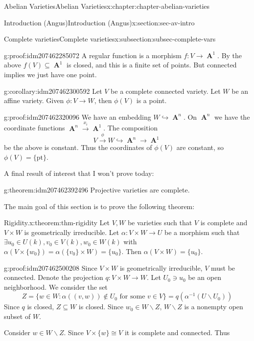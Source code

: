 \documentclass[oneside,10pt,]{book}
\numberwithin{equation}{section}
\DeclareMathOperator{\aff}{\mathbf{A}}
\begin{document}
\begin{chapterptx}{Abelian Varieties}{}{Abelian Varieties}{}{}{x:chapter:chapter-abelian-varieties}
\begin{sectionptx}{Introduction (Angus)}{}{Introduction (Angus)}{}{}{x:section:sec-av-intro}
\begin{subsectionptx}{Complete varieties}{}{Complete varieties}{}{}{x:subsection:subsec-complete-vars}
\begin{proofptx}{}{g:proof:idm207462285072}
A regular function is a morphism \(f\colon V \to \aff^1\). By the above \(f(V) \subseteq \aff^1\) is closed, and this is a finite set of points. But connected implies we just have one point.%
\end{proofptx}
\begin{corollary}{}{}{g:corollary:idm207462300592}%
Let \(V \) be a complete connected variety. Let \(W\) be an affine variety. Given \(\phi\colon V\to W\), then \(\phi (V)\) is a point.%
\end{corollary}
\begin{proofptx}{}{g:proof:idm207462320096}
We have an embedding \(W \hookrightarrow \aff^n\). On \(\aff^n\) we have the coordinate functions \(\aff^n \xrightarrow{x_i} \aff^1\). The composition%
\begin{equation*}
V \xrightarrow\phi W \hookrightarrow\aff^n \to \aff^1
\end{equation*}
be the above is constant. Thus the coordinates of \(\phi(V)\) are constant, so \(\phi(V) = \{\text{pt}\}\).%
\end{proofptx}
A final result of interest that I won't prove today:%
\begin{theorem}{}{}{g:theorem:idm207462392496}%
Projective varieties are complete.%
\end{theorem}
The main goal of this section is to prove the following theorem:%
\begin{theorem}{Rigidity.}{}{x:theorem:thm-rigidity}%
Let \(V,W\) be varieties such that \(V\) is complete and  \(V\times W\) is geometrically irreducible. Let \(\alpha\colon V\times W \to U\) be a morphism such that \(\exists u_0\in U(k), v_0\in V(k), w_0\in W(k)\) with \(\alpha(V\times\{w_0\}) = \alpha (\{v_0\}\times W ) = \{u_0\}\). Then \(\alpha (V\times W) = \{u_0\}\).%
\end{theorem}
\begin{proofptx}{}{g:proof:idm207462500208}
Since \(V\times W\) is geometrically irreducible, \(V\) must be connected. Denote the projection \(q\colon V\times W \to W\). Let \(U_0 \ni u_0\) be an open neighborhood. We consider the set%
\begin{equation*}
Z = \{w\in W : \alpha((v,w)) \not\in U_0 \text{ for some } v\in V\} = q(\alpha^{-1}(U\smallsetminus U_0))
\end{equation*}
Since \(q\) is closed, \(Z\subseteq W\) is closed. Since \(w_0\in W\smallsetminus Z\), \(W\smallsetminus Z\) is a nonempty open subset of \(W\).%
\par
Consider \(w \in W\smallsetminus Z\). Since \(V\times\{w\} \cong V\) it is complete and connected. Thus%

\end{proofptx}
\end{subsectionptx}
\end{sectionptx}
\end{chapterptx}
\end{document}
